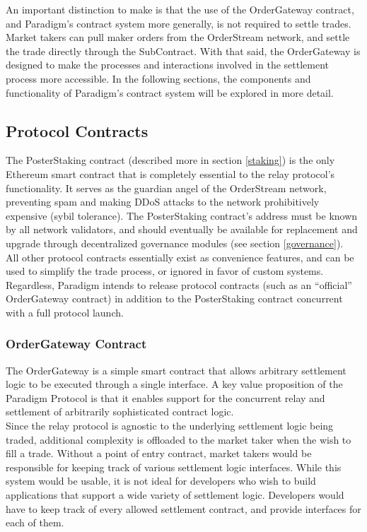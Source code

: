 \documentclass[9pt]{article}
\begin{document}
\noindent An important distinction to make is that the use of the OrderGateway contract, and Paradigm’s contract system more generally, is not required to settle trades. Market takers can pull maker orders from the OrderStream network, and settle the trade directly through the SubContract. With that said, the OrderGateway is designed to make the processes and interactions involved in the settlement process more accessible. In the following sections, the components and functionality of Paradigm’s contract system will be explored in more detail.

\subsection{Protocol Contracts}
\noindent The PosterStaking contract (described more in section \ref{staking}) is the only Ethereum smart contract that is completely essential to the relay protocol’s functionality. It serves as the guardian angel of the OrderStream network, preventing spam and making DDoS attacks to the network prohibitively expensive (sybil tolerance). The PosterStaking contract’s address must be known by all network validators, and should eventually be available for replacement and upgrade through decentralized governance modules (see section \ref{governance}). \\

\noindent All other protocol contracts essentially exist as convenience features, and can be used to simplify the trade process, or ignored in favor of custom systems. Regardless, Paradigm intends to release protocol contracts (such as an “official” OrderGateway contract) in addition to the PosterStaking contract concurrent with a full protocol launch.

\subsubsection{OrderGateway Contract}\label{ordergateway}
\noindent The OrderGateway is a simple smart contract that allows arbitrary settlement logic to be executed through a single interface. A key value proposition of the Paradigm Protocol is that it enables support for the concurrent relay and settlement of arbitrarily sophisticated contract logic. \\

\noindent Since the relay protocol is agnostic to the underlying settlement logic being traded, additional complexity is offloaded to the market taker when the wish to fill a trade. Without a point of entry contract, market takers would be responsible for keeping track of various settlement logic interfaces. While this system would be usable, it is not ideal for developers who wish to build applications that support a wide variety of settlement logic. Developers would have to keep track of every allowed settlement contract, and provide interfaces for each of them. \\
\end{document}
